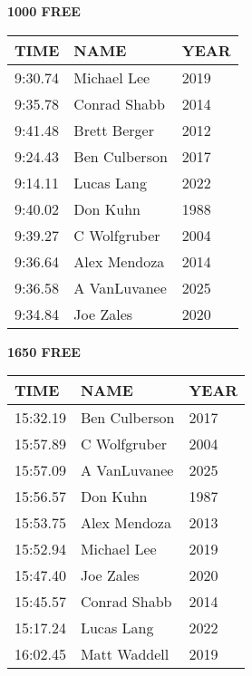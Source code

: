 \begin{table}[H]
\centering
\begin{minipage}[t]{0.48\textwidth}
\centering
\textbf{1000 FREE}\\[0.1cm]
\begin{tabular}{@{}p{1.8cm}p{2.8cm}p{1.2cm}@{}}
\hline
    \textbf{TIME} & \textbf{NAME} & \textbf{YEAR} \\
\hline
    9:30.74 & Michael Lee & 2019 \\
    9:35.78 & Conrad Shabb & 2014 \\
    9:41.48 & Brett Berger & 2012 \\
    9:24.43 & Ben Culberson & 2017 \\
    9:14.11 & Lucas Lang & 2022 \\
    9:40.02 & Don Kuhn & 1988 \\
    9:39.27 & C Wolfgruber & 2004 \\
    9:36.64 & Alex Mendoza & 2014 \\
    9:36.58 & A VanLuvanee & 2025 \\
    9:34.84 & Joe Zales & 2020 \\
\hline
\end{tabular}
\end{minipage}\hfill
\begin{minipage}[t]{0.48\textwidth}
\centering
\textbf{1650 FREE}\\[0.1cm]
\begin{tabular}{@{}p{1.8cm}p{2.8cm}p{1.2cm}@{}}
\hline
    \textbf{TIME} & \textbf{NAME} & \textbf{YEAR} \\
\hline
    15:32.19 & Ben Culberson & 2017 \\
    15:57.89 & C Wolfgruber & 2004 \\
    15:57.09 & A VanLuvanee & 2025 \\
    15:56.57 & Don Kuhn & 1987 \\
    15:53.75 & Alex Mendoza & 2013 \\
    15:52.94 & Michael Lee & 2019 \\
    15:47.40 & Joe Zales & 2020 \\
    15:45.57 & Conrad Shabb & 2014 \\
    15:17.24 & Lucas Lang & 2022 \\
    16:02.45 & Matt Waddell & 2019 \\
\hline
\end{tabular}
\end{minipage}
\end{table}

